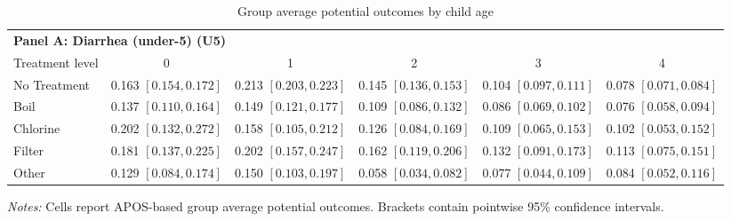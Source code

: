 \begin{table}[p]
\centering
\caption{Group average potential outcomes by child age}
\label{tab:gapo_childage}
\small
\setlength{\tabcolsep}{4pt}
\begin{adjustbox}{max width=\linewidth, center}
\begin{tabular}{lccccc}
\toprule
\multicolumn{6}{l}{\textbf{Panel A: Diarrhea (under-5) (U5)}} \\
Treatment level & 0 & 1 & 2 & 3 & 4 \\
\midrule
No Treatment & 0.163 {\scriptsize$[0.154,0.172]$} & 0.213 {\scriptsize$[0.203,0.223]$} & 0.145 {\scriptsize$[0.136,0.153]$} & 0.104 {\scriptsize$[0.097,0.111]$} & 0.078 {\scriptsize$[0.071,0.084]$} \\
Boil & 0.137 {\scriptsize$[0.110,0.164]$} & 0.149 {\scriptsize$[0.121,0.177]$} & 0.109 {\scriptsize$[0.086,0.132]$} & 0.086 {\scriptsize$[0.069,0.102]$} & 0.076 {\scriptsize$[0.058,0.094]$} \\
Chlorine & 0.202 {\scriptsize$[0.132,0.272]$} & 0.158 {\scriptsize$[0.105,0.212]$} & 0.126 {\scriptsize$[0.084,0.169]$} & 0.109 {\scriptsize$[0.065,0.153]$} & 0.102 {\scriptsize$[0.053,0.152]$} \\
Filter & 0.181 {\scriptsize$[0.137,0.225]$} & 0.202 {\scriptsize$[0.157,0.247]$} & 0.162 {\scriptsize$[0.119,0.206]$} & 0.132 {\scriptsize$[0.091,0.173]$} & 0.113 {\scriptsize$[0.075,0.151]$} \\
Other & 0.129 {\scriptsize$[0.084,0.174]$} & 0.150 {\scriptsize$[0.103,0.197]$} & 0.058 {\scriptsize$[0.034,0.082]$} & 0.077 {\scriptsize$[0.044,0.109]$} & 0.084 {\scriptsize$[0.052,0.116]$} \\
\bottomrule
\end{tabular}
\end{adjustbox}
\par\vspace{3pt}
\begin{minipage}{\linewidth}\footnotesize \textit{Notes:} Cells report APOS-based group average potential outcomes. Brackets contain pointwise 95\% confidence intervals.\end{minipage}
\end{table}
